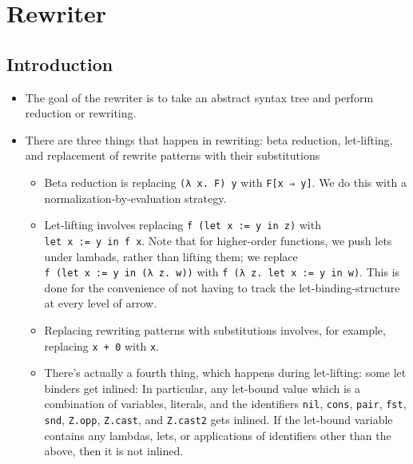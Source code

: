 \hypertarget{rewriter}{%
\section{Rewriter}\label{rewriter}}

\hypertarget{introduction}{%
\subsection{Introduction}\label{introduction}}

\begin{itemize}
\tightlist
\item
  The goal of the rewriter is to take an abstract syntax tree and
  perform reduction or rewriting.
\item
  There are three things that happen in rewriting: beta reduction,
  let-lifting, and replacement of rewrite patterns with their
  substitutions

  \begin{itemize}
  \tightlist
  \item
    Beta reduction is replacing \texttt{(λ\ x.\ F)\ y} with
    \texttt{F{[}x\ ⇒\ y{]}}. We do this with a
    normalization-by-evaluation strategy.
  \item
    Let-lifting involves replacing \texttt{f\ (let\ x\ :=\ y\ in\ z)}
    with \texttt{let\ x\ :=\ y\ in\ f\ x}. Note that for higher-order
    functions, we push lets under lambads, rather than lifting them; we
    replace \texttt{f\ (let\ x\ :=\ y\ in\ (λ\ z.\ w))} with
    \texttt{f\ (λ\ z.\ let\ x\ :=\ y\ in\ w)}. This is done for the
    convenience of not having to track the let-binding-structure at
    every level of arrow.
  \item
    Replacing rewriting patterns with substitutions involves, for
    example, replacing \texttt{x\ +\ 0} with \texttt{x}.
  \item
    There's actually a fourth thing, which happens during let-lifting:
    some let binders get inlined: In particular, any let-bound value
    which is a combination of variables, literals, and the identifiers
    \texttt{nil}, \texttt{cons}, \texttt{pair}, \texttt{fst},
    \texttt{snd}, \texttt{Z.opp}, \texttt{Z.cast}, and \texttt{Z.cast2}
    gets inlined. If the let-bound variable contains any lambdas, lets,
    or applications of identifiers other than the above, then it is not
    inlined.
  \end{itemize}
\end{itemize}

